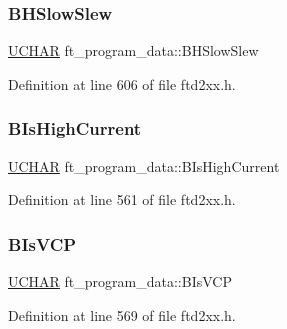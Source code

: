 \subsubsection{\texorpdfstring{B\+H\+Slow\+Slew}{BHSlowSlew}}
{\footnotesize\ttfamily \hyperlink{CatCaloProto40MHz_2inc_2WinTypes_8h_a4f4bb67531a9bf6f0b9c6ad76aeba587}{U\+C\+H\+AR} ft\+\_\+program\+\_\+data\+::\+B\+H\+Slow\+Slew}



Definition at line 606 of file ftd2xx.\+h.

\mbox{\label{structft__program__data_afa8a84a2a087e3169f72cdd3c930fc77}} 
\subsubsection{\texorpdfstring{B\+Is\+High\+Current}{BIsHighCurrent}}
{\footnotesize\ttfamily \hyperlink{CatCaloProto40MHz_2inc_2WinTypes_8h_a4f4bb67531a9bf6f0b9c6ad76aeba587}{U\+C\+H\+AR} ft\+\_\+program\+\_\+data\+::\+B\+Is\+High\+Current}



Definition at line 561 of file ftd2xx.\+h.

\mbox{\label{structft__program__data_a3ccf7887147a8140e74c9659de64c7aa}} 
\subsubsection{\texorpdfstring{B\+Is\+V\+CP}{BIsVCP}}
{\footnotesize\ttfamily \hyperlink{CatCaloProto40MHz_2inc_2WinTypes_8h_a4f4bb67531a9bf6f0b9c6ad76aeba587}{U\+C\+H\+AR} ft\+\_\+program\+\_\+data\+::\+B\+Is\+V\+CP}



Definition at line 569 of file ftd2xx.\+h.

\mbox{\label{structft__program__data_aabc8856caa07b72c2b9f3db72addb74e}} 
